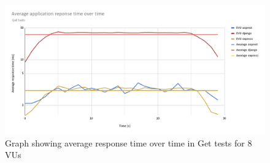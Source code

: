 \begin{figure}[H]
    \includegraphics[width=\columnwidth]{figures/pictures/influxGraph8VU.png}
    \caption{Graph showing average response time over time in Get tests for 8 VUs}
    \label{fig:influxGraph8}
\end{figure}
